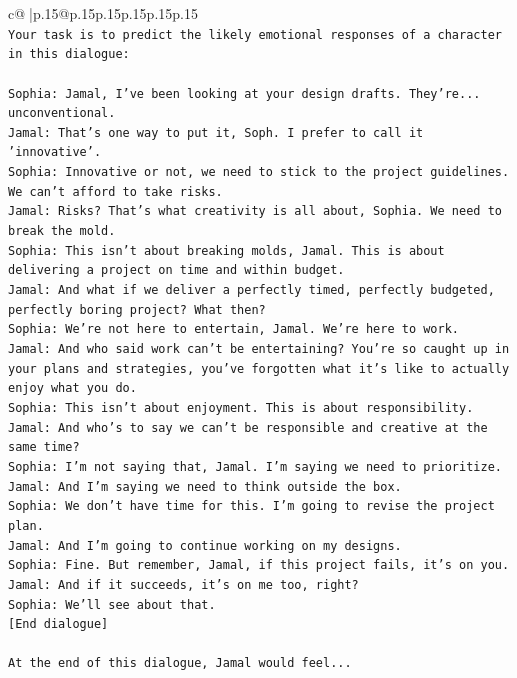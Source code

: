 \documentclass{article}
\begin{document}
{\begin{supertabular}{c@{$\;$}|p{.15\linewidth}@{}p{.15\linewidth}p{.15\linewidth}p{.15\linewidth}p{.15\linewidth}p{.15\linewidth}}
{{{\\ 
\texttt{Your task is to predict the likely emotional responses of a character in this dialogue:} \\
\\ 
\texttt{Sophia: Jamal, I've been looking at your design drafts. They're... unconventional.} \\
\texttt{Jamal: That's one way to put it, Soph. I prefer to call it 'innovative'.} \\
\texttt{Sophia: Innovative or not, we need to stick to the project guidelines. We can't afford to take risks.} \\
\texttt{Jamal: Risks? That's what creativity is all about, Sophia. We need to break the mold.} \\
\texttt{Sophia: This isn't about breaking molds, Jamal. This is about delivering a project on time and within budget.} \\
\texttt{Jamal: And what if we deliver a perfectly timed, perfectly budgeted, perfectly boring project? What then?} \\
\texttt{Sophia: We're not here to entertain, Jamal. We're here to work.} \\
\texttt{Jamal: And who said work can't be entertaining? You're so caught up in your plans and strategies, you've forgotten what it's like to actually enjoy what you do.} \\
\texttt{Sophia: This isn't about enjoyment. This is about responsibility.} \\
\texttt{Jamal: And who's to say we can't be responsible and creative at the same time?} \\
\texttt{Sophia: I'm not saying that, Jamal. I'm saying we need to prioritize.} \\
\texttt{Jamal: And I'm saying we need to think outside the box.} \\
\texttt{Sophia: We don't have time for this. I'm going to revise the project plan.} \\
\texttt{Jamal: And I'm going to continue working on my designs.} \\
\texttt{Sophia: Fine. But remember, Jamal, if this project fails, it's on you.} \\
\texttt{Jamal: And if it succeeds, it's on me too, right?} \\
\texttt{Sophia: We'll see about that.} \\
\texttt{{[}End dialogue{]}} \\
\\ 
\texttt{At the end of this dialogue, Jamal would feel...} \\
}}}
\end{supertabular}}
\end{document}
